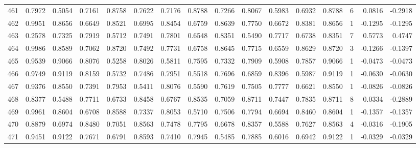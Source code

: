 \begin{tabular}{lrrrrrrrrrrrrrrr}
461 &      0.7972 &  0.5054 &  0.7161 &  0.8758 &  0.7622 &  0.7176 &  0.8788 &  0.7266 &  0.8067 &  0.5983 &   0.6932 &     0.8788 &      6 &                    0.0816 &                    -0.2918 \\
462 &      0.9951 &  0.8656 &  0.6649 &  0.8521 &  0.6995 &  0.8454 &  0.6759 &  0.8639 &  0.7750 &  0.6672 &   0.8381 &     0.8656 &      1 &                   -0.1295 &                    -0.1295 \\
463 &      0.2578 &  0.7325 &  0.7919 &  0.5712 &  0.7491 &  0.7801 &  0.6548 &  0.8351 &  0.5490 &  0.7717 &   0.6738 &     0.8351 &      7 &                    0.5773 &                     0.4747 \\
464 &      0.9986 &  0.8589 &  0.7062 &  0.8720 &  0.7492 &  0.7731 &  0.6758 &  0.8645 &  0.7715 &  0.6559 &   0.8629 &     0.8720 &      3 &                   -0.1266 &                    -0.1397 \\
465 &      0.9539 &  0.9066 &  0.8076 &  0.5258 &  0.8026 &  0.5811 &  0.7595 &  0.7332 &  0.7909 &  0.5908 &   0.7857 &     0.9066 &      1 &                   -0.0473 &                    -0.0473 \\
466 &      0.9749 &  0.9119 &  0.8159 &  0.5732 &  0.7486 &  0.7951 &  0.5518 &  0.7696 &  0.6859 &  0.8396 &   0.5987 &     0.9119 &      1 &                   -0.0630 &                    -0.0630 \\
467 &      0.9376 &  0.8550 &  0.7391 &  0.7953 &  0.5411 &  0.8076 &  0.5590 &  0.7619 &  0.7505 &  0.7777 &   0.6621 &     0.8550 &      1 &                   -0.0826 &                    -0.0826 \\
468 &      0.8377 &  0.5488 &  0.7711 &  0.6733 &  0.8458 &  0.6767 &  0.8535 &  0.7059 &  0.8711 &  0.7447 &   0.7835 &     0.8711 &      8 &                    0.0334 &                    -0.2889 \\
469 &      0.9961 &  0.8604 &  0.6708 &  0.8588 &  0.7337 &  0.8053 &  0.5710 &  0.7506 &  0.7794 &  0.6694 &   0.8460 &     0.8604 &      1 &                   -0.1357 &                    -0.1357 \\
470 &      0.8879 &  0.6974 &  0.8480 &  0.7051 &  0.8563 &  0.7478 &  0.7795 &  0.6678 &  0.8357 &  0.5588 &   0.7627 &     0.8563 &      4 &                   -0.0316 &                    -0.1905 \\
471 &      0.9451 &  0.9122 &  0.7671 &  0.6791 &  0.8593 &  0.7410 &  0.7945 &  0.5485 &  0.7885 &  0.6016 &   0.6942 &     0.9122 &      1 &                   -0.0329 &                    -0.0329 \\

\end{tabular}
